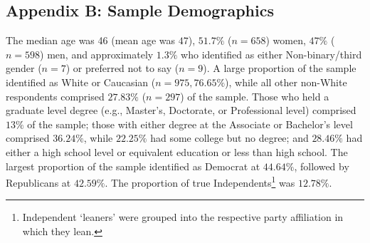 \documentclass[
  12pt,
  letterpaper,
]{article}
\begin{document}
\begin{figure}
\begin{minipage}{0.45\linewidth}
\end{minipage}%

\end{figure}%

\newpage

\subsection{Appendix B: Sample Demographics}\label{sec-appendix-b}

The median age was 46 (mean age was \(47\)), \(51.7\%\) (\(n = 658\))
women, \(47\%\) (\(n = 598\)) men, and approximately \(1.3\%\) who
identified as either Non-binary/third gender (\(n = 7\)) or preferred
not to say (\(n = 9\)). A large proportion of the sample identified as
White or Caucasian (\(n = 975, 76.65\%\)), while all other non-White
respondents comprised \(27.83\%\) (\(n = 297\)) of the sample. Those who
held a graduate level degree (e.g., Master's, Doctorate, or Professional
level) comprised \(13\%\) of the sample; those with either degree at the
Associate or Bachelor's level comprised \(36.24\%\), while \(22.25\%\)
had some college but no degree; and \(28.46\%\) had either a high school
level or equivalent education or less than high school. The largest
proportion of the sample identified as Democrat at \(44.64\%\), followed
by Republicans at \(42.59\%\). The proportion of true
Independents\footnote{Independent `leaners' were grouped into the
  respective party affiliation in which they lean.} was \(12.78\%\).
\end{document}
